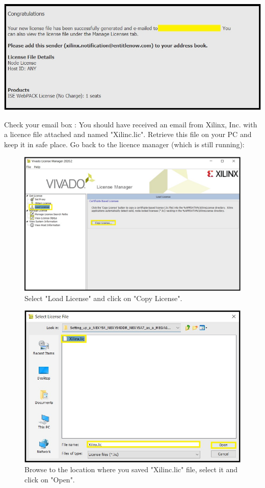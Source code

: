 \includegraphics[width=\linewidth]{images/VivadoInstimg029.jpg}

Check your email box : You should have received an email from Xilinx, Inc. with a licence file attached and named "Xilinc.lic".
Retrieve this file on your PC and keep it in safe place.
Go back to the licence manager (which is still running):

\begin{figure}[H]
\centering
  \includegraphics[width=0.8\linewidth]{images/VivadoInstimg030.jpg}
  \captionsetup{width=0.8\linewidth}
  \caption{Select "Load License" and click on "Copy License".}
  \label{fig:VivadoInstimg030}
\end{figure}

\begin{figure}[H]
\centering
  \includegraphics[width=0.8\linewidth]{images/VivadoInstimg031.jpg}
  \captionsetup{width=0.8\linewidth}
  \caption{Browse to the location where you saved "Xilinc.lic" file, select it and click on "Open".}
  \label{fig:VivadoInstimg031}
\end{figure}

